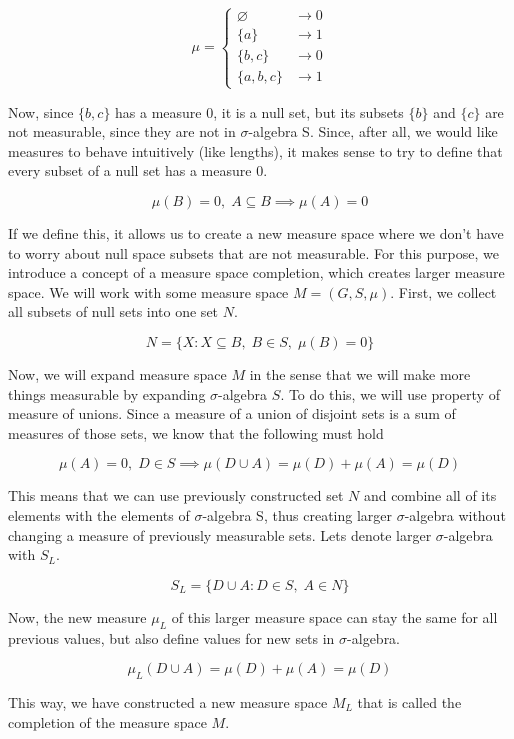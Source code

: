 \documentclass{article}
\begin{document}
\[\mu=\begin{cases}
    \varnothing & \to 0 \\
    \{a\} & \to 1 \\
    \{b,c\} & \to 0 \\
    \{a,b,c\} & \to 1
\end{cases}\]

Now, since $\{b,c\}$ has a measure 0, it is a null set, but its subsets $\{b\}$ and $\{c\}$ are not measurable, since they are not in $\sigma$-algebra S. Since, after all, we would like measures to behave intuitively (like lengths), it makes sense to try to define that every subset of a null set has a measure 0.

\[ \mu(B)=0,\;A \subseteq B \implies \mu(A)=0 \]

If we define this, it allows us to create a new measure space where we don't have to worry about null space subsets that are not measurable. For this purpose, we introduce a concept of a measure space completion, which creates larger measure space. We will work with some measure space $M=(G,S,\mu)$. First, we collect all subsets of null sets into one set $N$.

\[ N=\{X:X \subseteq B,\;B \in S,\;\mu(B)=0\} \]

Now, we will expand measure space $M$ in the sense that we will make more things measurable by expanding $\sigma$-algebra $S$. To do this, we will use property of measure of unions. Since a measure of a union of disjoint sets is a sum of measures of those sets, we know that the following must hold

\[ \mu(A)=0,\;D \in S \implies \mu(D \cup A)=\mu(D)+\mu(A)=\mu(D) \]

This means that we can use previously constructed set $N$ and combine all of its elements with the elements of $\sigma$-algebra S, thus creating larger $\sigma$-algebra without changing a measure of previously measurable sets. Lets denote larger $\sigma$-algebra with $S_{L}$.

\[ S_{L}=\{D \cup A: D \in S,\;A \in N\} \]

Now, the new measure $\mu_{L}$ of this larger measure space can stay the same for all previous values, but also define values for new sets in $\sigma$-algebra.

\[ \mu_{L}(D \cup A)=\mu(D) + \mu(A) = \mu(D) \]

This way, we have constructed a new measure space $M_{L}$ that is called the completion of the measure space $M$.
\end{document}
